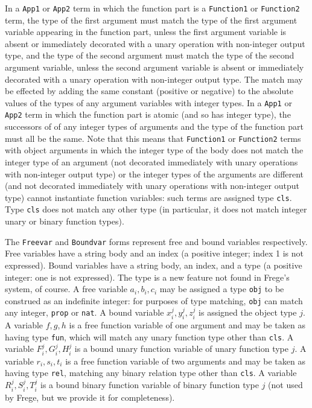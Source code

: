 \documentclass{article}
\begin{document}
{{  In a {\tt App1} or {\tt App2} term in which the function part is a {\tt Function1} or {\tt Function2} term, the type of the first argument must match the type of the first argument variable appearing in the function part, unless the first argument variable is absent or immediately decorated with a unary operation with non-integer output type, and the type of the second argument must match the type of the second argument variable, unless the second argument variable is absent or immediately decorated with a unary operation with non-integer output type.
The match may be effected by adding the same constant (positive or negative) to the absolute values of the types of any argument variables with integer types.  In a {\tt App1} or {\tt App2} term in which the function part is atomic (and so has integer type), the successors of  of any integer types of arguments and the type of the function part must all be the same.  Note that this means that {\tt Function1} or {\tt Function2} terms with object arguments in which the integer type of the body does not match the integer type of an argument (not decorated immediately with unary operations with non-integer output type) or the integer types of the arguments are different (and not decorated immediately with unary operations with non-integer output type) cannot instantiate function variables:  such terms are assigned type {\tt cls}.  Type {\tt cls} does not match any other type (in particular, it does not match integer unary or binary function types).

The {\tt Freevar} and {\tt Boundvar} forms represent free and bound variables respectively.  Free variables have a string body and an index
(a positive integer;  index 1 is  not expressed).  Bound variables have a string body, an index,  and a type (a positive integer:  one is not expressed).  The type is a new feature not found in Frege's system, of course.  A free variable $a_i, b_i, c_i$ may be assigned a type {\tt obj} to be construed as an indefinite integer:  for purposes of type matching, {\tt obj} can match any integer, {\tt prop} or {\tt nat}.  A bound variable $x^j_i, y^j_i, z^j_i$ is assigned the object type $j$.  A variable $f,g,h$ is a free function variable of one argument and may be taken as having type {\tt fun}, which will match any unary function type other than {\tt cls}.  A variable $F^j_i,G^j_i,H^j_i$ is a bound unary function variable of unary function type $j$.  A variable $r_i,s_i,t_i$ is a free function variable of two arguments and may be taken as having type {\tt rel}, matching any binary relation type other than {\tt cls}.  A variable $R^j_i,S^j_i,T^j_i$ is a bound binary function variable of binary function type $j$ (not used by Frege, but we provide it for completeness).

}}
\end{document}

